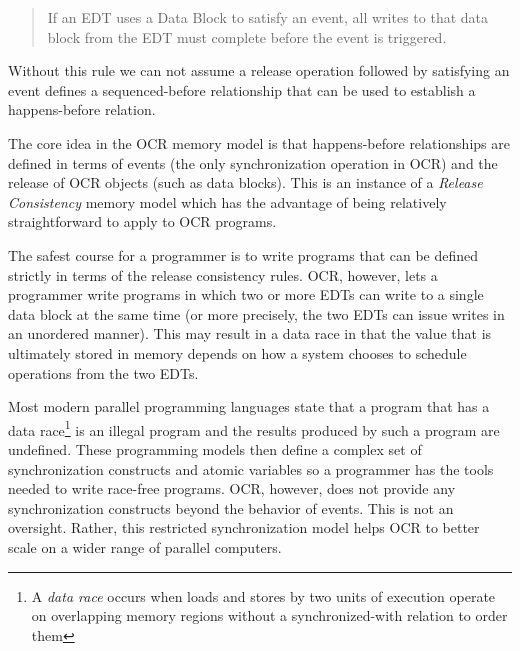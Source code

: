 \begin{quote}
If an EDT uses a Data Block to satisfy an event, all writes to that data block
from the EDT must complete before the event is triggered.
\end{quote}

Without this rule we can not assume a release operation followed by
satisfying an event defines a sequenced-before relationship that can
be used to establish a happens-before relation.

The core idea in the OCR memory model is that happens-before
relationships are defined in terms of events (the only synchronization
operation in OCR) and the release of OCR objects (such as data
blocks). This is an instance of a \emph{Release
Consistency} memory model which has the
advantage of being relatively straightforward to apply to OCR
programs.

The safest course for a programmer is to write programs that can be
defined strictly in terms of the release consistency rules. OCR,
however, lets a programmer write programs in which two or more EDTs can
write to a single data block at the same time (or more precisely, the
two EDTs can issue writes in an unordered manner). This may result in a
data race in that the value that is ultimately stored
in memory depends on how a system chooses to schedule operations from
the two EDTs.

Most modern parallel programming languages state that a program that
has a data race\footnote{A \emph{data race} occurs when loads and
stores by two units of execution operate on overlapping memory regions
without a synchronized-with relation to order them} is an illegal
program and the results produced by such a program are undefined.
These programming models then define a complex set of synchronization
constructs and atomic variables so a programmer has the tools needed
to write race-free programs. OCR, however, does not provide any
synchronization constructs beyond the behavior of events. This is not
an oversight. Rather, this restricted synchronization model helps OCR
to better scale on a wider range of parallel computers.

